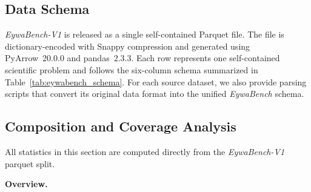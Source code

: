 \documentclass{llmxive}
\begin{document}
{\subsection{Data Schema}

\begin{table}[!htbp]
    \centering
\caption{Data schema of \textit{EywaBench}. The benchmark is stored as a dictionary-encoded Parquet file with 200 task instances and six fields.}
\label{tab:eywabench_schema}
\end{table}


\textit{EywaBench-V1} is released as a single self-contained Parquet file. The file is dictionary-encoded with Snappy compression and generated using PyArrow~20.0.0 and pandas~2.3.3. Each row represents one self-contained scientific problem and follows the six-column schema summarized in Table~\ref{tab:eywabench_schema}. For each source dataset, we also provide parsing scripts that convert its original data format into the unified \textit{EywaBench} schema.


\subsection{Composition and Coverage Analysis}
\label{sec:eywabench_analysis}


All statistics in this section are computed directly from the \textit{EywaBench-V1} parquet split.

\textbf{Overview.}

}
\end{document}
